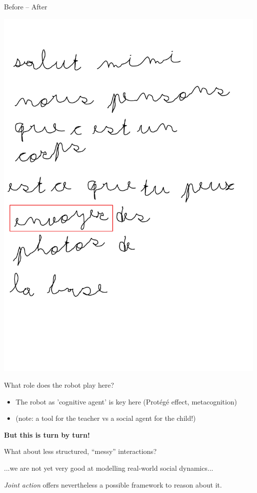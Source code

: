 \documentclass[compress]{beamer}
\begin{document}
\begin{frame}{Before -- After}
\begin{center}
{            \hspace{1cm}%
        \includegraphics[width=0.43\linewidth]{cowriter/lettre-final-highlight}
        }
    \end{center}
\end{frame}


\begin{frame}{What role does the robot play here?}
    \begin{itemize}
        \item<+-> The robot as 'cognitive agent' is key here (Protégé effect,
            metacognition)
        \item<+-> (note: a tool for the teacher vs a social agent for the child!)
    \end{itemize}
\end{frame}

\begin{frame}[plain]

    \begin{center}

    {\Large\bf
    But this is turn by turn!

    What about less structured, ``messy'' interactions?
    }

    \pause

    ...we are not yet very good at modelling real-world social dynamics...

        \emph{Joint action} offers nevertheless a possible framework to reason
        about it.
    \end{center}
\end{frame}

\end{document}
